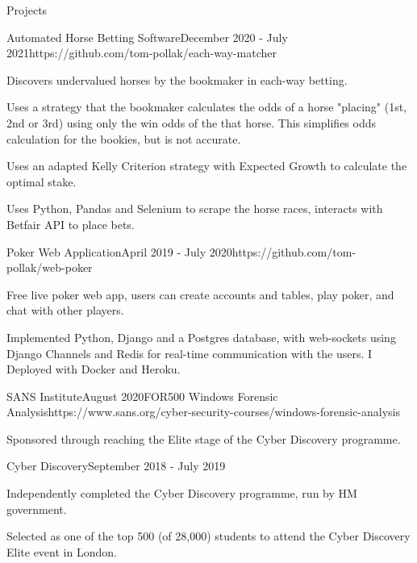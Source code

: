 \documentclass{structure}
\begin{document}
\begin{rSection}{Projects}

\begin{rSubsection}{Automated Horse Betting Software}{December 2020 - July 2021}{}{}{https://github.com/tom-pollak/each-way-matcher}
    \item Discovers undervalued horses by the bookmaker in each-way betting.
    \item Uses a strategy that the bookmaker calculates the odds of a horse
    "placing" (1st, 2nd or 3rd) using only the win odds of the that horse. This simplifies
    odds calculation for the bookies, but is not accurate.
    \item Uses an adapted Kelly Criterion strategy with Expected Growth to calculate
    the optimal stake.
    \item Uses Python, Pandas and Selenium to scrape the horse races, interacts with
    Betfair API to place bets.
\end{rSubsection}

\begin{rSubsection}{Poker Web Application}{April 2019 - July 2020}{}{}{https://github.com/tom-pollak/web-poker}
    \item Free live poker web app, users can create accounts and tables, play poker, and chat with other players.
    \item Implemented Python, Django and a Postgres database, with web-sockets using Django Channels and Redis for real-time communication with the users. I Deployed with Docker and Heroku.
\end{rSubsection}

\begin{rSubsection}{SANS Institute}{August 2020}{FOR500 Windows Forensic Analysis}{}{https://www.sans.org/cyber-security-courses/windows-forensic-analysis}
    \item Sponsored through reaching the Elite stage of the Cyber Discovery programme.
\end{rSubsection}

\begin{rSubsection}{Cyber Discovery}{September 2018 - July 2019}{}{}{}
    \item Independently completed the Cyber Discovery programme, run by HM government.
    \item Selected as one of the top 500 (of 28,000) students to attend the Cyber Discovery Elite event in London.
\end{rSubsection}

\end{rSection}
\end{document}
